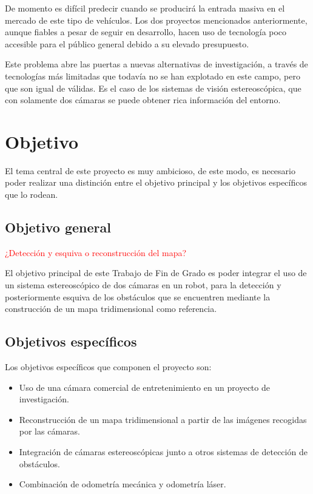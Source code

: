 De momento es difícil predecir cuando se producirá la entrada masiva en el
mercado de este tipo de vehículos. Los dos proyectos mencionados anteriormente,
aunque fiables a pesar de seguir en desarrollo, hacen uso de tecnología poco
accesible para el público general debido a su elevado presupuesto.

Este problema abre las puertas a nuevas alternativas de investigación, a través
de tecnologías más limitadas que todavía no se han explotado en este campo, pero
que son igual de válidas. Es el caso de los sistemas de visión estereoscópica,
que con solamente dos cámaras se puede obtener rica información del entorno.


\section{Objetivo}
\label{1:sec:3}

El tema central de este proyecto es muy ambicioso, de este modo, es necesario
poder realizar una distinción entre el objetivo principal y los objetivos
específicos que lo rodean.

\subsection{Objetivo general}

\textcolor{red}{¿Detección y esquiva o reconstrucción del mapa?}

El objetivo principal de este Trabajo de Fin de Grado es poder integrar el uso
de un sistema estereoscópico de dos cámaras en un robot, para la detección y
posteriormente esquiva de los obstáculos que se encuentren mediante la
construcción de un mapa tridimensional como referencia.

\subsection{Objetivos específicos}

Los objetivos específicos que componen el proyecto son:
\begin{itemize}
  \item Uso de una cámara comercial de entretenimiento en un proyecto de
  investigación.
  \item Reconstrucción de un mapa tridimensional a partir de las imágenes
  recogidas por las cámaras.
  \item Integración de cámaras estereoscópicas junto a otros sistemas de
  detección de obstáculos.
  \item Combinación de odometría mecánica y odometría láser.
\end{itemize}


